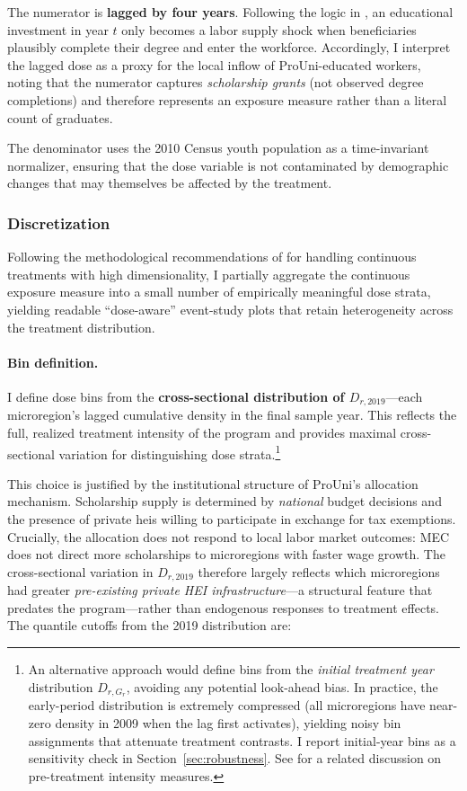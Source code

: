 The numerator is \textbf{lagged by four years}. Following the logic in , an educational investment in year $t$ only becomes a labor supply shock when beneficiaries plausibly complete their degree and enter the workforce. Accordingly, I interpret the lagged dose as a proxy for the local inflow of ProUni-educated workers, noting that the numerator captures \emph{scholarship grants} (not observed degree completions) and therefore represents an exposure measure rather than a literal count of graduates.

The denominator uses the 2010 Census youth population as a time-invariant normalizer, ensuring that the dose variable is not contaminated by demographic changes that may themselves be affected by the treatment.


\subsubsection{Discretization}
\label{sec:discretization}
Following the methodological recommendations of  for handling continuous treatments with high dimensionality, I partially aggregate the continuous exposure measure into a small number of empirically meaningful dose strata, yielding readable ``dose-aware'' event-study plots that retain heterogeneity across the treatment distribution.

\paragraph{Bin definition.}
I define dose bins from the \textbf{cross-sectional distribution of $D_{r,2019}$}---each microregion's lagged cumulative density in the final sample year. This reflects the full, realized treatment intensity of the program and provides maximal cross-sectional variation for distinguishing dose strata.\footnote{An alternative approach would define bins from the \emph{initial treatment year} distribution $D_{r,G_r}$, avoiding any potential look-ahead bias. In practice, the early-period distribution is extremely compressed (all microregions have near-zero density in 2009 when the lag first activates), yielding noisy bin assignments that attenuate treatment contrasts. I report initial-year bins as a sensitivity check in Section~\ref{sec:robustness}. See  for a related discussion on pre-treatment intensity measures.}

This choice is justified by the institutional structure of ProUni's allocation mechanism. Scholarship supply is determined by \emph{national} budget decisions and the presence of private \acrshort{hei}s willing to participate in exchange for tax exemptions. Crucially, the allocation does not respond to local labor market outcomes: MEC does not direct more scholarships to microregions with faster wage growth. The cross-sectional variation in $D_{r,2019}$ therefore largely reflects which microregions had greater \emph{pre-existing private HEI infrastructure}---a structural feature that predates the program---rather than endogenous responses to treatment effects. The quantile cutoffs from the 2019 distribution are:

